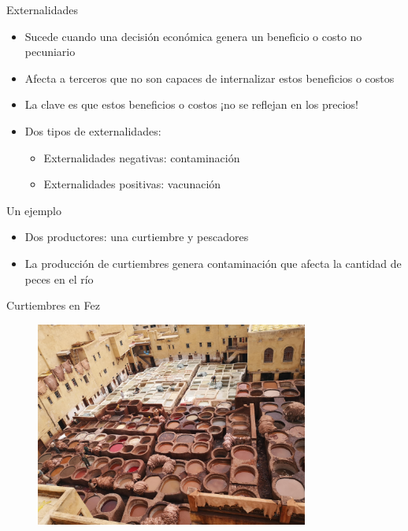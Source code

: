 \documentclass{beamer}
\begin{document}
\begin{frame}{Externalidades}
    \begin{itemize}
        \item Sucede cuando una decisión económica genera un beneficio o costo no pecuniario
        \item Afecta a terceros que no son capaces de internalizar estos beneficios o costos
        \item La clave es que estos beneficios o costos ¡no se reflejan en los precios!
        \vspace{1mm}
        \item Dos tipos de externalidades: 
        \begin{itemize}
            \item Externalidades negativas: contaminación \vspace{1mm}
            \item Externalidades positivas: vacunación
        \end{itemize}
        
    \end{itemize}
\end{frame}

\begin{frame}{Un ejemplo}
    \begin{itemize}
        \item Dos productores: una curtiembre y pescadores
        \item La producción de curtiembres genera contaminación que afecta la cantidad de peces en el río
    \end{itemize}
\end{frame}

\begin{frame}{Curtiembres en Fez}

\begin{figure} [h!]
    \centering
    \includegraphics[width=0.8\textwidth]{Figures/Fez.jpg}
\end{figure}
\end{frame}
\end{document}
